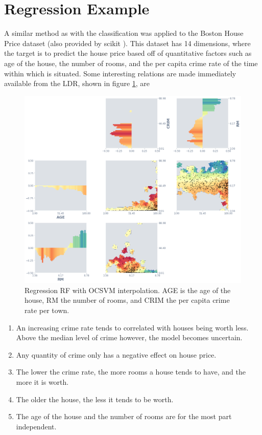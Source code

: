 \documentclass[a4paper, twocolumn]{article}
\begin{document}
\section{Regression Example}

A similar method as with the classification was applied to the Boston House Price dataset \cite{boston-house} (also provided by scikit \cite{scikit-learn}). This dataset has 14 dimensions, where the target is to predict the house price based off of quantitative factors such as age of the house, the number of rooms, and the per capita crime rate of the time within which is situated. Some interesting relations are made immediately available from the LDR, shown in figure \ref{fig:reg-rf-ocsvm-matrix}, are

\begin{figure}
\centering
\includegraphics[width=\columnwidth]{img/reg_rf_ocsvm_matrix.png}
\caption{Regression RF with OCSVM interpolation. AGE is the age of the house, RM the number of rooms, and CRIM the per capita crime rate per town.}
\label{fig:reg-rf-ocsvm-matrix}
\end{figure}

\begin{enumerate}
\item An increasing crime rate tends to correlated with houses being worth less. Above the median level of crime however, the model becomes uncertain.
\item Any quantity of crime only has a negative effect on house price.
\item The lower the crime rate, the more rooms a house tends to have, and the more it is worth.
\item The older the house, the less it tends to be worth.
\item The age of the house and the number of rooms are for the most part independent.
\end{enumerate}
\end{document}
